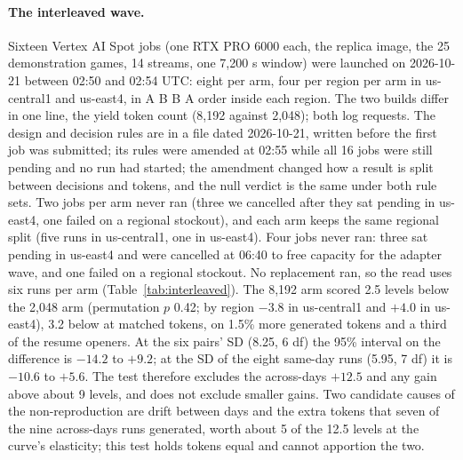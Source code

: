 \paragraph{The interleaved wave.}
Sixteen Vertex AI Spot jobs (one RTX PRO 6000 each, the replica image, the 25 demonstration games, 14 streams, one 7,200 s window) were launched on 2026-10-21 between 02:50 and 02:54 UTC: eight per arm, four per region per arm in us-central1 and us-east4, in A B B A order inside each region. The two builds differ in one line, the yield token count (8,192 against 2,048); both log requests. The design and decision rules are in a file dated 2026-10-21, written before the first job was submitted; its rules were amended at 02:55 while all 16 jobs were still pending and no run had started; the amendment changed how a result is split between decisions and tokens, and the null verdict is the same under both rule sets. Two jobs per arm never ran (three we cancelled after they sat pending in us-east4, one failed on a regional stockout), and each arm keeps the same regional split (five runs in us-central1, one in us-east4). %
Four jobs never ran: three sat pending in us-east4 and were cancelled at 06:40 to free capacity for the adapter wave, and one failed on a regional stockout. No replacement ran, so the read uses six runs per arm (Table~\ref{tab:interleaved}). %
The 8,192 arm scored 2.5 levels below the 2,048 arm (permutation $p$ 0.42; by region $-3.8$ in us-central1 and $+4.0$ in us-east4), 3.2 below at matched tokens, on 1.5\% more generated tokens and a third of the resume openers. At the six pairs' SD (8.25, 6 df) the 95\% interval on the difference is $-14.2$ to $+9.2$; at the SD of the eight same-day runs (5.95, 7 df) it is $-10.6$ to $+5.6$. The test therefore excludes the across-days $+12.5$ and any gain above about 9 levels, and does not exclude smaller gains. %
Two candidate causes of the non-reproduction are drift between days and the extra tokens that seven of the nine across-days runs generated, worth about 5 of the 12.5 levels at the curve's elasticity; this test holds tokens equal and cannot apportion the two. %

